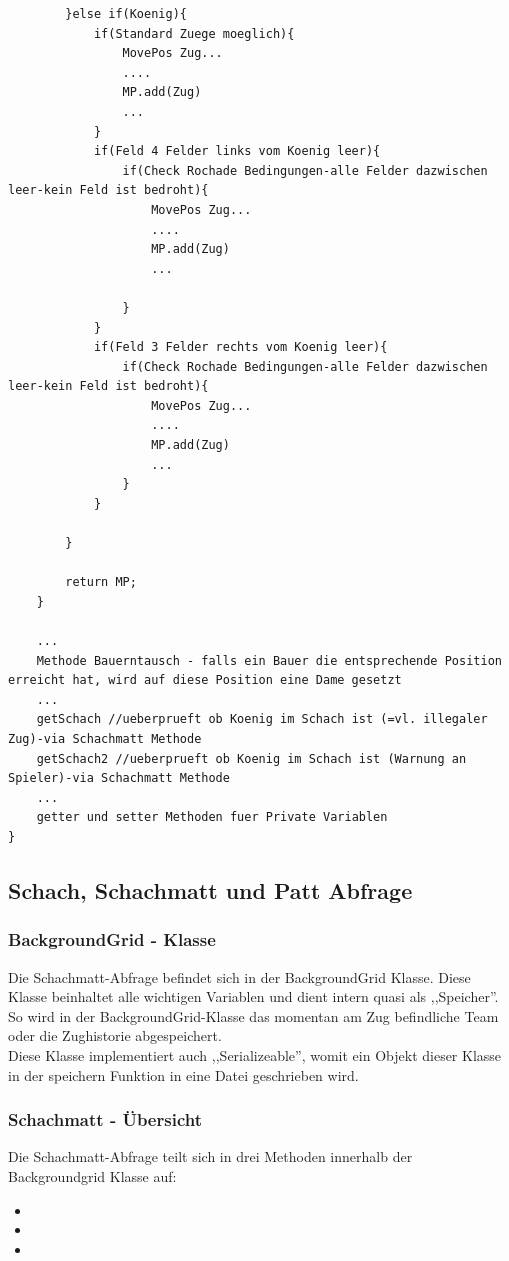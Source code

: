 \documentclass[12pt,a4paper]{article}
\begin{document}
{\begin{lstlisting}
		}else if(Koenig){
			if(Standard Zuege moeglich){
				MovePos Zug...
				....
				MP.add(Zug)
				...
			}
			if(Feld 4 Felder links vom Koenig leer){
				if(Check Rochade Bedingungen-alle Felder dazwischen leer-kein Feld ist bedroht){
					MovePos Zug...
					....
					MP.add(Zug)
					...
					
				}
			}
			if(Feld 3 Felder rechts vom Koenig leer){
				if(Check Rochade Bedingungen-alle Felder dazwischen leer-kein Feld ist bedroht){
					MovePos Zug...
					....
					MP.add(Zug)
					...
				}
			}
		
		}
		
		return MP;
	}
	
	...
	Methode Bauerntausch - falls ein Bauer die entsprechende Position erreicht hat, wird auf diese Position eine Dame gesetzt
	...
	getSchach //ueberprueft ob Koenig im Schach ist (=vl. illegaler Zug)-via Schachmatt Methode
	getSchach2 //ueberprueft ob Koenig im Schach ist (Warnung an Spieler)-via Schachmatt Methode
	...
	getter und setter Methoden fuer Private Variablen
}
\end{lstlisting}

\subsection{Schach, Schachmatt und Patt Abfrage}
\label{SUBSEC:checkmate}

\subsubsection{BackgroundGrid - Klasse}

Die Schachmatt-Abfrage befindet sich in der BackgroundGrid Klasse. Diese Klasse beinhaltet alle wichtigen Variablen und dient intern quasi als ,,Speicher''. So wird in der BackgroundGrid-Klasse das momentan am Zug befindliche Team oder die Zughistorie abgespeichert. \\
Diese Klasse implementiert auch ,,Serializeable'', womit ein Objekt dieser Klasse in der speichern Funktion in eine Datei geschrieben wird. \\

\subsubsection{Schachmatt - Übersicht}

Die Schachmatt-Abfrage teilt sich in drei Methoden innerhalb der Backgroundgrid Klasse auf:
\begin{itemize}
	\item{}
	\item{}
	\item{}
\end{itemize}



}
\end{document}
